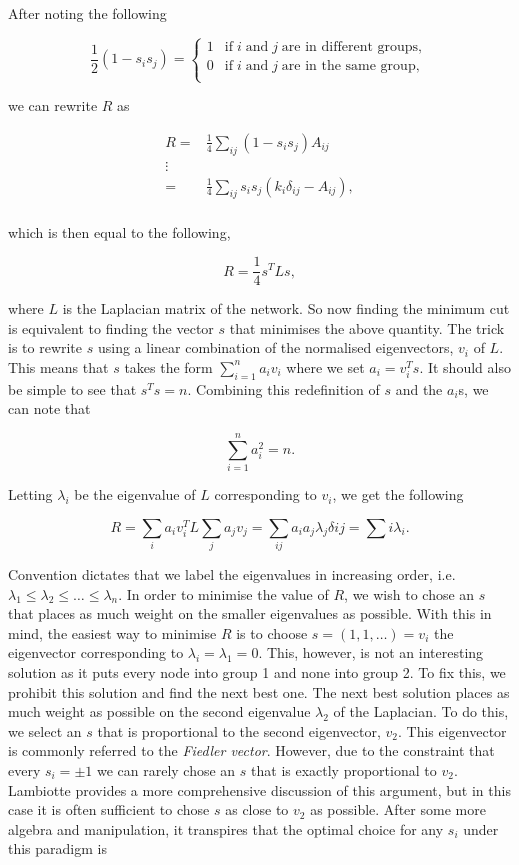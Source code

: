 \noindent
After noting the following

$$ \frac{1}{2}(1 - s_i s_j) = 
\begin{cases}
    1 & \text{if} \; i \; \text{and} \; j \; \text{are in different groups}, \\
    0 & \text{if} \; i \; \text{and} \; j \; \text{are in the same group}, \\
\end{cases}
$$

\noindent
we can rewrite $R$ as

$$
\begin{aligned}
    R =& \frac{1}{4}\sum_{ij}(1 - s_i s_j)A_{ij} \\
      \vdots & \\
      =& \frac{1}{4}\sum_{ij}s_i s_j(k_i\delta_{ij} - A_{ij}), \\
\end{aligned}
$$

\noindent
which is then equal to the following,

$$ R = \frac{1}{4}s^TLs, $$

\noindent
where $L$ is the Laplacian matrix of the network. So now finding the minimum cut is equivalent to finding the vector $s$ that minimises the above quantity. The trick is to rewrite $s$ using a linear combination of the normalised eigenvectors, $v_i$ of $L$. This means that $s$ takes the form $\sum_{i=1}^n a_iv_i$ where we set $a_i = v_i^T s$. It should also be simple to see that $s^Ts = n$. Combining this redefinition of $s$ and the $a_i$s, we can note that

$$ \sum_{i=1}^n a_i^2 = n. $$

\noindent
Letting $\lambda_i$ be the eigenvalue of $L$ corresponding to $v_i$, we get the following

$$ R = \sum_i a_iv_i^TL\sum_ja_jv_j = \sum_{ij}a_ia_j\lambda_j\delta{ij} = \sum{i}\lambda_i. $$

Convention dictates that we label the eigenvalues in increasing order, i.e. $\lambda_1 \leq \lambda_2 \leq \dots \leq \lambda_n$. In order to minimise the value of $R$, we wish to chose an $s$ that places as much weight on the smaller eigenvalues as possible. With this in mind, the easiest way to minimise $R$ is to choose $s = (1, 1, \dots) = v_i$ the eigenvector corresponding to $\lambda_i = \lambda_1 = 0$. This, however, is not an interesting solution as it puts every node into group 1 and none into group 2. To fix this, we prohibit this solution and find the next best one. The next best solution places as much weight as possible on the second eigenvalue $\lambda_2$ of the Laplacian. To do this, we select an $s$ that is proportional to the second eigenvector, $v_2$. This eigenvector is commonly referred to the \emph{Fiedler vector}. However, due to the constraint that every $s_i = \pm 1$ we can rarely chose an $s$ that is exactly proportional to $v_2$. Lambiotte provides a more comprehensive discussion of this argument, but in this case it is often sufficient to chose $s$ as close to $v_2$ as possible. After some more algebra and manipulation, it transpires that the optimal choice for any $s_i$ under this paradigm is 

